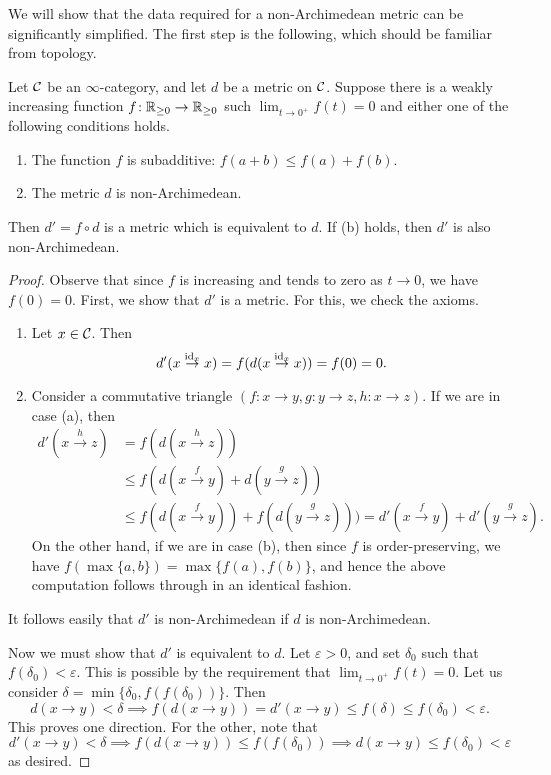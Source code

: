 We will show that the data required for a non-Archimedean metric can be significantly simplified. The first step is the following, which should be familiar from topology.
\begin{lemma}\label{lemma:metric-category-composition-with-nice-function-yields-equivalent-metric}
	Let \(\mathcal{C}\) be an \(\infty\)-category, and let \(d\) be a metric on \(\mathcal{C}\). Suppose there is a weakly increasing function \(f\!:\mathbb{R}_{\geq 0}\to\mathbb{R}_{\geq 0}\) such
	\(\lim_{t\to 0^+}f(t) = 0\) and either one of the following conditions holds.
	\begin{enumerate}[label=(\alph*)]
		\item The function \(f\) is subadditive: \(f(a+b) \leq f(a) + f(b)\).
		\item The metric \(d\) is non-Archimedean.
	\end{enumerate}
	Then \(d' = f\circ d\) is a metric which is equivalent to \(d\). If (b) holds, then \(d'\) is also non-Archimedean.
\end{lemma}
\begin{proof}
Observe that since \(f\) is increasing and tends to zero as \(t\to 0\), we have \(f(0)=0\). First, we show that \(d'\) is a metric. For this, we check the axioms.
\begin{enumerate}[label=(\arabic*)]
	\item Let \(x\in\mathcal{C}\). Then
	\[ d'(x\overset{\mathrm{id}_x}\to x) = f(d(x\overset{\mathrm{id}_x}\to x)) = f(0) = 0. \]
	\item Consider a commutative triangle \((f\!:x\to y,g\!:y\to z,h\!:x\to z)\). If we are in case (a), then
	\begin{align*}
		d'(x\overset{h}\to z) &= f(d(x\overset{h}\to z)) \\
		&\leq f(d(x\overset{f}\to y) + d(y\overset{g}\to z)) \\
		&\leq f(d(x\overset{f}\to y)) + f(d(y\overset{g}\to z))) = d'(x\overset{f}\to y) + d'(y\overset{g}\to z).
	\end{align*}
	On the other hand, if we are in case (b), then since \(f\) is order-preserving, we have \(f(\max\{a,b\}) = \max\{f(a),f(b)\}\), and hence the above computation
	follows through in an identical fashion.
\end{enumerate}
It follows easily that \(d'\) is non-Archimedean if \(d\) is non-Archimedean.

Now we must show that \(d'\) is equivalent to \(d\). Let \(\varepsilon > 0\), and set \(\delta_0\) such that \(f(\delta_0) < \varepsilon\). This is possible by the requirement that
\(\lim_{t\to 0^+}f(t) = 0\). Let us consider \(\delta = \min\{\delta_0, f(f(\delta_0))\}\). Then
\[ d(x\to y) < \delta \implies f(d(x\to y)) = d'(x\to y) \leq f(\delta) \leq f(\delta_0) < \varepsilon. \]
This proves one direction. For the other, note that
\[ d'(x\to y) < \delta \implies f(d(x\to y)) \leq f(f(\delta_0)) \implies d(x\to y) \leq f(\delta_0) < \varepsilon \]
as desired.
\end{proof}


